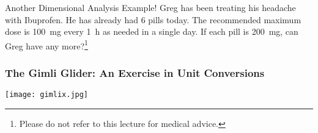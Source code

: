 \documentclass[11pt,letterpaper]{article}
\begin{document}
\begin{frame}[t]{Another Dimensional Analysis Example!}
	Greg has been treating his headache with Ibuprofen. He has already had 6
	pills today. The recommended maximum dose is \SI{100}{\milli\gram} every
	\SI{1}{h} as needed in a single day. If each pill is
	\SI{200}{\milli\gram}, can Greg have any more?\footnote{Please do not
	refer to this lecture for medical advice.}

\end{frame}

\begin{frame}[c]
	\frametitle{The Gimli Glider: An Exercise in Unit Conversions}
	\begin{center}
		\texttt{[image: gimlix.jpg]}
	\end{center}
\end{frame}
\end{document}
